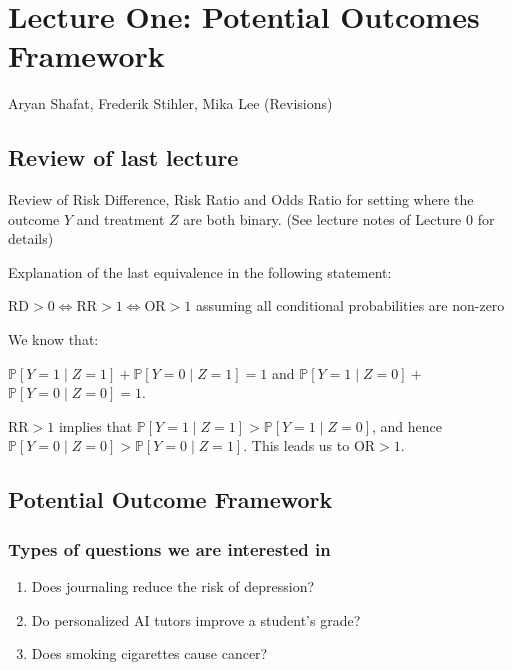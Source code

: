 \documentclass[11pt]{elegantbook}
\begin{document}
\section{Lecture One: Potential Outcomes Framework}{Aryan Shafat, Frederik Stihler, Mika Lee (Revisions)}

\subsection{Review of last lecture}\label{sec:review}
Review of Risk Difference, Risk Ratio and Odds Ratio for setting where the outcome $Y$ and treatment $Z$ are both binary. (See lecture notes of Lecture 0 for details)

Explanation of the last equivalence in the following statement:
\begin{center}
$\mathrm{RD} > 0 \Longleftrightarrow \mathrm{RR} > 1 \Longleftrightarrow \mathrm{OR} > 1$ assuming all conditional probabilities are non-zero
\end{center}

We know that:

\begin{center}
    $\mathbb{P}[Y = 1 \mid Z = 1] + \mathbb{P}[Y = 0 \mid Z = 1] = 1$ and
    $\mathbb{P}[Y = 1 \mid Z = 0] +$ $\mathbb{P}[Y = 0 \mid Z = 0] = 1$. 
\end{center}    
    $\mathrm{RR} > 1$ implies that $\mathbb{P}[Y = 1 \mid Z = 1] > \mathbb{P}[Y = 1 \mid Z = 0]$, and hence $\mathbb{P}[Y = 0 \mid Z = 0] > \mathbb{P}[Y = 0 \mid Z = 1]$. This leads us to $\mathrm{OR} > 1$.

\subsection{Potential Outcome Framework}\label{sec:pof}

\subsubsection{Types of questions we are interested in}

\begin{enumerate}
    \item Does journaling reduce the risk of depression?
    \item Do personalized AI tutors improve a student's grade?
    \item Does smoking cigarettes cause cancer?
\end{enumerate}
\end{document}
